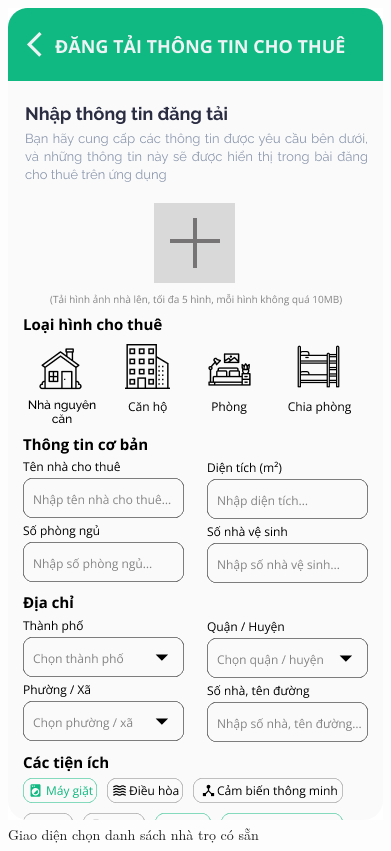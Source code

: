 \begin{figure}[!htb]
\begin{minipage}{0.32\textwidth}
     \caption{Giao diện chọn danh sách nhà trọ có sẵn}
   \end{minipage}\hfill
   \begin{minipage}{0.32\textwidth}
     \centering
     \includegraphics[width=1\linewidth]{Images/UI figma/Upload Rooming House 2.png}

\end{minipage}
\end{figure}
